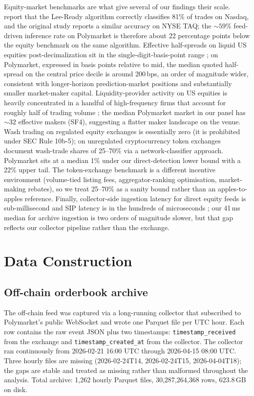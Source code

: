 \documentclass[11pt,a4paper,twocolumn]{article}
\begin{document}
Equity-market benchmarks are what give several of our findings their
scale. \citet{ellis-michaely-ohara-2000} report that the Lee-Ready
algorithm correctly classifies 81\% of trades on Nasdaq, and the
original \citet{lee-ready-1991} study reports a similar accuracy on
NYSE TAQ; the $\sim 59\%$ feed-driven inference rate on Polymarket
is therefore about 22 percentage points below the equity benchmark
on the same algorithm.
Effective half-spreads on liquid US equities post-decimalization sit
in the single-digit-basis-point range
\citep{hasbrouck-2007,foucault-pagano-roell-2013}; on Polymarket,
expressed in basis points relative to mid, the median quoted
half-spread on the central price decile is around 200\,bps, an order
of magnitude wider, consistent with longer-horizon prediction-market
positions and substantially smaller market-maker capital.
Liquidity-provider activity on US equities is heavily concentrated
in a handful of high-frequency firms that account for roughly half
of trading volume \citep{brogaard-hendershott-riordan-2014}; the
median Polymarket market in our panel has $\sim 32$ effective makers
(SF4), suggesting a flatter maker landscape on the venue. Wash
trading on regulated equity exchanges is essentially zero (it is
prohibited under SEC Rule 10b-5); on unregulated cryptocurrency
token exchanges \citet{cong-li-tang-yang-2023} document wash-trade shares
of 25--70\% via a network-classifier approach. Polymarket sits at a
median 1\% under our direct-detection lower bound with a 22\% upper
tail. The token-exchange benchmark is a different incentive
environment (volume-tied listing fees, aggregator-ranking
optimisation, market-making rebates), so we treat 25--70\% as a
sanity bound rather than an apples-to-apples reference. Finally,
collector-side ingestion latency for direct equity feeds is
sub-millisecond and SIP latency is in the hundreds of microseconds
\citep{hasbrouck-2007}; our 41\,ms median for archive ingestion is
two orders of magnitude slower, but that gap reflects our
collector pipeline rather than the exchange.
\section{Data Construction}\label{sec:dataconstruction}

\subsection{Off-chain orderbook archive}

The off-chain feed was captured via a long-running collector that
subscribed to Polymarket's public WebSocket and wrote one Parquet
file per UTC hour. Each row contains the raw event JSON plus two
timestamps: \texttt{timestamp\_received} from the exchange and
\texttt{timestamp\_created\_at} from the collector. The collector
ran continuously from 2026-02-21 16:00 UTC through 2026-04-15 08:00
UTC. Three hourly files are missing
(2026-02-24T14, 2026-02-24T15, 2026-04-04T18); the gaps are stable
and treated as missing rather than malformed throughout the
analysis. Total archive: 1{,}262 hourly Parquet files,
30{,}287{,}264{,}368 rows, 623.8\,GB on disk.
\end{document}
